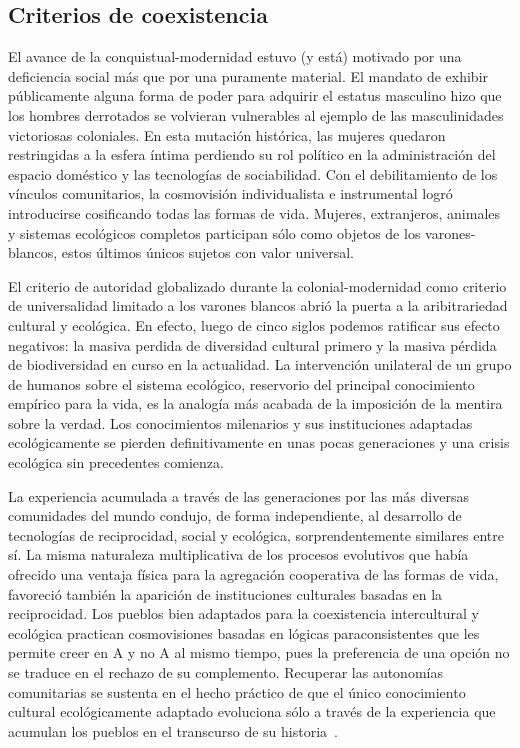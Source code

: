 \documentclass[a4paper,10pt]{book}
\theoremstyle{definition}
\begin{document}
\subsection{Criterios de coexistencia}

El avance de la conquistual-modernidad estuvo (y está) motivado por una deficiencia social más que por una puramente material.
El mandato de exhibir públicamente alguna forma de poder para adquirir el estatus masculino hizo que los hombres derrotados se volvieran vulnerables al ejemplo de las masculinidades victoriosas coloniales.
En esta mutación histórica, las mujeres quedaron restringidas a la esfera íntima perdiendo su rol político en la administración del espacio doméstico y las tecnologías de sociabilidad.
Con el debilitamiento de los vínculos comunitarios, la cosmovisión individualista e instrumental logró introducirse cosificando todas las formas de vida.
Mujeres, extranjeros, animales y sistemas ecológicos completos participan sólo como objetos de los varones-blancos, estos últimos únicos sujetos con valor universal.


El criterio de autoridad globalizado durante la colonial-modernidad como criterio de universalidad limitado a los varones blancos abrió la puerta a la aribitrariedad cultural y ecológica.
En efecto, luego de cinco siglos podemos ratificar sus efecto negativos: la masiva perdida de diversidad cultural primero y la masiva pérdida de biodiversidad en curso en la actualidad.
La intervención unilateral de un grupo de humanos sobre el sistema ecológico, reservorio del principal conocimiento empírico para la vida, es la analogía más acabada de la imposición de la mentira sobre la verdad.
Los conocimientos milenarios y sus instituciones adaptadas ecológicamente se pierden definitivamente en unas pocas generaciones y una crisis ecológica sin precedentes comienza.
  

La experiencia acumulada a través de las generaciones por las más diversas comunidades del mundo condujo, de forma independiente, al desarrollo de tecnologías de reciprocidad, social y ecológica, sorprendentemente similares entre sí.
La misma naturaleza multiplicativa de los procesos evolutivos que había ofrecido una ventaja física para la agregación cooperativa de las formas de vida, favoreció también la aparición de instituciones culturales basadas en la reciprocidad.
Los pueblos bien adaptados para la coexistencia intercultural y ecológica practican cosmovisiones basadas en lógicas paraconsistentes que les permite creer en A y no A al mismo tiempo, pues la preferencia de una opción no se traduce en el rechazo de su complemento.
Recuperar las autonomías comunitarias se sustenta en el hecho práctico de que el único conocimiento cultural ecológicamente adaptado evoluciona sólo a través de la experiencia que acumulan los pueblos en el transcurso de su historia~\cite{segato2013-colonialidad}.
\end{document}
